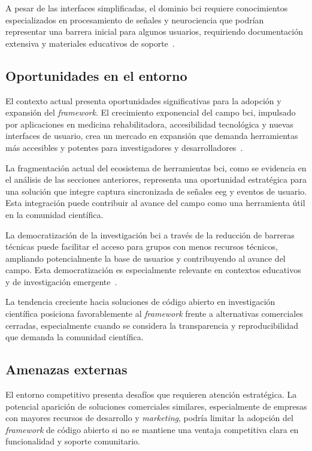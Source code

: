 A pesar de las interfaces simplificadas, el dominio \acrshort{bci} requiere conocimientos especializados en procesamiento de señales y neurociencia que podrían representar una barrera inicial para algunos usuarios, requiriendo documentación extensiva y materiales educativos de soporte~\cite{lotte2013flaws}.

\subsection{Oportunidades en el entorno}
\label{subsec:oportunidades}

El contexto actual presenta oportunidades significativas para la adopción y expansión del \textit{\gls{framework}}. El crecimiento exponencial del campo \acrshort{bci}, impulsado por aplicaciones en medicina rehabilitadora, accesibilidad tecnológica y nuevas interfaces de usuario, crea un mercado en expansión que demanda herramientas más accesibles y potentes para investigadores y desarrolladores~\cite{eeg_bci_review,millán2004noninvasive}.

La fragmentación actual del ecosistema de herramientas \acrshort{bci}, como se evidencia en el análisis de las secciones anteriores, representa una oportunidad estratégica para una solución que integre captura sincronizada de señales \acrshort{eeg} y eventos de usuario. Esta integración puede contribuir al avance del campo como una herramienta útil en la comunidad científica.

La democratización de la investigación \acrshort{bci} a través de la reducción de barreras técnicas puede facilitar el acceso para grupos con menos recursos técnicos, ampliando potencialmente la base de usuarios y contribuyendo al avance del campo. Esta democratización es especialmente relevante en contextos educativos y de investigación emergente~\cite{sellers2006noninvasive}.

La tendencia creciente hacia soluciones de código abierto en investigación científica posiciona favorablemente al \textit{\gls{framework}} frente a alternativas comerciales cerradas, especialmente cuando se considera la transparencia y reproducibilidad que demanda la comunidad científica.

\subsection{Amenazas externas}
\label{subsec:amenazas}

El entorno competitivo presenta desafíos que requieren atención estratégica. La potencial aparición de soluciones comerciales similares, especialmente de empresas con mayores recursos de desarrollo y \textit{marketing}, podría limitar la adopción del \textit{\gls{framework}} de código abierto si no se mantiene una ventaja competitiva clara en funcionalidad y soporte comunitario.

